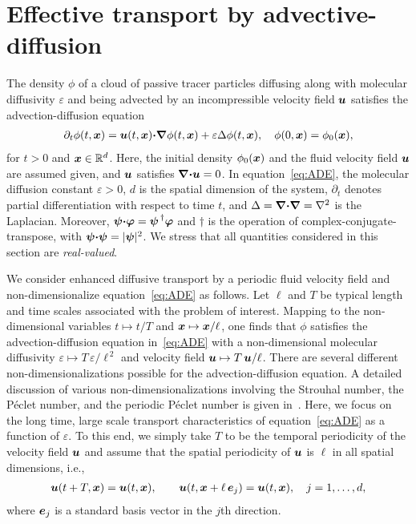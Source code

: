 \documentclass[amsa]{ipart}
\begin{document}
\section{Effective transport by
  advective-diffusion} \label{sec:Eff_Trans}    
%
The density $\phi$ of a cloud of passive tracer particles diffusing along
with molecular diffusivity $\varepsilon$ and being advected by an incompressible
velocity field $\boldsymbol{u}$ satisfies the advection-diffusion equation
%
\begin{align}\label{eq:ADE}
  \partial_t\phi(t,\vecx)
    =\vecu (t,\vecx)\bcdot\bnabla \phi(t,\vecx)+\varepsilon\Delta \phi(t,\vecx),
  \quad
  \phi(0,\vecx)=\phi_0(\vecx),  
\end{align}
%
for $t>0$ and $\boldsymbol{x}\in\mathbb{R}^d$.
Here, the initial density $\phi_0(\boldsymbol{x})$ and the fluid velocity field
$\boldsymbol{u}$ are assumed given, and $\boldsymbol{u}$ satisfies $\mbox{\boldmath${\nabla}$}\mbox{\boldmath${\cdot}$}\boldsymbol{u}=0$.
In equation~\eqref{eq:ADE}, the molecular diffusion constant $\varepsilon>0$,
$d$ is the spatial dimension of the 
system, $\partial_t$ denotes partial differentiation with respect to time
$t$, and $\Delta=\mbox{\boldmath${\nabla}$}\mbox{\boldmath${\cdot}$}\mbox{\boldmath${\nabla}$} =\nabla^2$ is the Laplacian. Moreover, 
$\boldsymbol{\psi}\mbox{\boldmath${\cdot}$}\boldsymbol{\varphi}=\boldsymbol{\psi}^{\,\dagger}\boldsymbol{\varphi}$ and $\dagger$ is the
operation of complex-conjugate-transpose, with
$\boldsymbol{\psi}\mbox{\boldmath${\cdot}$}\boldsymbol{\psi}=|\boldsymbol{\psi}|^2$. We stress that all quantities 
considered in this section are \emph{real-valued}. 




We consider enhanced diffusive transport by a periodic fluid velocity
field and non-dimensionalize equation~\eqref{eq:ADE} as follows. Let
$\ell$ and $T$ be typical length and time scales associated with the
problem of interest. Mapping to the non-dimensional variables
$t\mapsto t/T$ and $\boldsymbol{x}\mapsto \boldsymbol{x}/\ell$,
one finds that $\phi$ satisfies the advection-diffusion equation
in~\eqref{eq:ADE} with a non-dimensional molecular diffusivity 
$\varepsilon\mapsto T\,\varepsilon/\ell^{\,2}$ and velocity field $\boldsymbol{u}\mapsto T\,\boldsymbol{u} /\ell$. There are
several different non-dimensionalizations possible 
for the advection-diffusion equation. A detailed discussion of 
various non-dimensionalizations involving the Strouhal number, the
P\'{e}clet number, and the periodic P\'{e}clet number is given
in~\cite{McLaughlin:Forest:PF:1999:880,Majda:Kramer:1999:book}.  Here,
we focus on the long time, large scale transport characteristics of
equation~\eqref{eq:ADE} as a function of $\varepsilon$. To this end, we simply
take $T$ to be the temporal periodicity of the velocity field $\boldsymbol{u}$
and assume that the spatial periodicity of $\boldsymbol{u}$ is $\ell$ in all
spatial dimensions, i.e., 
%
\begin{align}\label{eq:Periodic_u}
  \vecu(t+T,\vecx)=\vecu(t,\vecx), \qquad
  \vecu(t,\vecx+\ell\,\vece_j)=\vecu(t,\vecx), \quad
  j=1,\ldots,d,
\end{align}
%
where $\boldsymbol{e}_j$ is a standard basis vector in the $j$th direction. 
\end{document}
